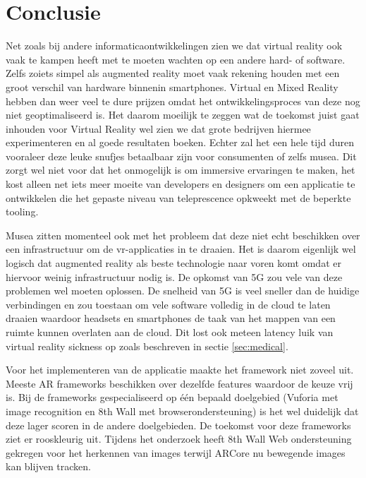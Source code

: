 
\chapter{Conclusie}
\label{ch:conclusie}


Net zoals bij andere informaticaontwikkelingen zien we dat virtual reality ook vaak te kampen heeft met te moeten wachten op een andere hard- of software. Zelfs zoiets simpel als augmented reality moet vaak rekening houden met een groot verschil van hardware binnenin smartphones. Virtual en Mixed Reality hebben dan weer veel te dure prijzen omdat het ontwikkelingsproces van deze nog niet geoptimaliseerd is. Het daarom moeilijk te zeggen wat de toekomst juist gaat inhouden voor Virtual Reality wel zien we dat grote bedrijven hiermee experimenteren en al goede resultaten boeken. Echter zal het een hele tijd duren vooraleer deze leuke snufjes betaalbaar zijn voor consumenten of zelfs musea. Dit zorgt wel niet voor dat het onmogelijk is om immersive ervaringen te maken, het kost alleen net iets meer moeite van developers en designers om een applicatie te ontwikkelen die het gepaste niveau van teleprescence opkweekt met de beperkte tooling.

Musea zitten momenteel ook met het probleem dat deze niet echt beschikken over een infrastructuur om de vr-applicaties in te draaien. Het is daarom eigenlijk wel logisch dat augmented reality als beste technologie naar voren komt omdat er hiervoor weinig infrastructuur nodig is. De opkomst van 5G zou vele van deze problemen wel moeten oplossen. De snelheid van 5G is veel sneller dan de huidige verbindingen en zou toestaan om vele software volledig in de cloud te laten draaien waardoor headsets en smartphones de taak van het mappen van een ruimte kunnen overlaten aan de cloud. Dit lost ook meteen latency luik van virtual reality sickness op zoals beschreven in sectie \ref{sec:medical}\autocite{Bastug2017}.

Voor het implementeren van de applicatie maakte het framework niet zoveel uit. Meeste AR frameworks beschikken over dezelfde features waardoor de keuze vrij is. Bij de frameworks gespecialiseerd op één bepaald doelgebied (Vuforia met image recognition en 8th Wall met browserondersteuning) is het wel duidelijk dat deze lager scoren in de andere doelgebieden. De toekomst voor deze frameworks ziet er rooskleurig uit. Tijdens het onderzoek heeft 8th Wall Web ondersteuning gekregen voor het herkennen van images terwijl ARCore nu bewegende images kan blijven tracken.

